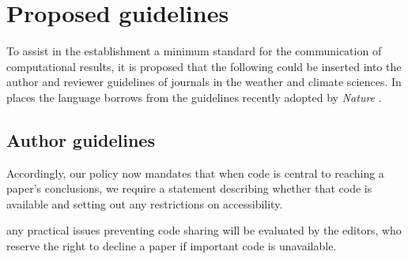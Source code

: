\section{Proposed guidelines}\label{s:guidelines}

To assist in the establishment a minimum standard for the communication of computational results, it is proposed that the following could be inserted into the author and reviewer guidelines of journals in the weather and climate sciences. In places the language borrows from the guidelines recently adopted by \textit{Nature} \citep{Nature2014}.

\subsection{Author guidelines}




Accordingly, our policy now mandates that when code is central to reaching a paper’s conclusions, we require a statement describing whether that code is available and setting out any restrictions on accessibility.

any practical issues preventing code sharing will be evaluated by the editors, who reserve the right to decline a paper if important code is unavailable.